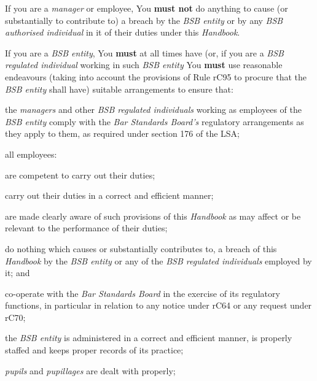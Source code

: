 
If you are a \emph{manager} or employee, You \textcolor{myred}{\textbf{must not}} do anything to
cause (or substantially to contribute to) a breach by the \emph{BSB
entity} or by any \emph{BSB authorised individual} in it of their duties
under this \emph{Handbook}.


If you are a \emph{BSB entity}, You \textcolor{myred}{\textbf{must}} at all times have (or, if you
are a \emph{BSB regulated individual} working in such \emph{BSB entity}
You \textcolor{myred}{\textbf{must}} use reasonable endeavours (taking into account the provisions
of Rule rC95 to procure that the \emph{BSB entity} shall have) suitable
arrangements to ensure that:
\begin{numlist}
\item the \emph{managers} and other \emph{BSB regulated individuals}
working as employees of the \emph{BSB entity} comply with the \emph{Bar
Standards Board's} regulatory arrangements as they apply to them, as
required under section 176 of the LSA;

\item all employees:
\begin{alphlist}
\item are competent to carry out their duties;

\item carry out their duties in a correct and efficient manner;

\item are made clearly aware of such provisions of this \emph{Handbook} as
may affect or be relevant to the performance of their duties;

\item do nothing which causes or substantially contributes to, a breach of
this \emph{Handbook} by the \emph{BSB entity} or any of the \emph{BSB
regulated individuals} employed by it; and

\item co-operate with the \emph{Bar Standards Board} in the exercise of its
regulatory functions, in particular in relation to any notice under rC64
or any request under rC70;
\end{alphlist}
\item the \emph{BSB entity} is administered in a correct and efficient
manner, is properly staffed and keeps proper records of its practice;

\item \emph{pupils} and \emph{pupillages} are dealt with properly;


\end{numlist}
